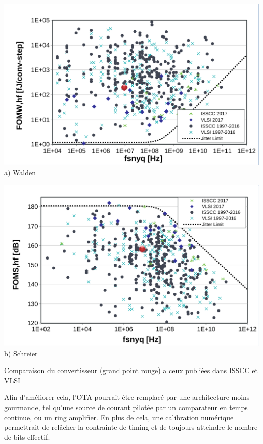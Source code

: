 \begin{mdframed}[linecolor=Prune,linewidth=1]
\begin{center}
    \centering
    \begin{minipage}[b]{0.49\linewidth}
        \centering
        \includegraphics[width=\textwidth]{Abstract/Figs/WaldenFoM-a.pdf}
        a) Walden
    \end{minipage}
    \begin{minipage}[b]{0.49\linewidth}
        \centering
        \includegraphics[width=\textwidth]{Abstract/Figs/SchreierFoM-a.pdf}
        b) Schreier
    \end{minipage}
    \caption[]{Comparaison du convertisseur (grand point rouge) a ceux publiées dans ISSCC et VLSI}
	\label{fig:fom-fr}
\end{center}

Afin d'améliorer cela, l'OTA pourrait être remplacé par une architecture moins gourmande, tel qu'une source de courant pilotée par un comparateur en temps continue, ou un ring amplifier. En plus de cela, une calibration numérique permettrait de relâcher la contrainte de timing et de toujours atteindre le nombre de bits effectif.

\end{mdframed}

